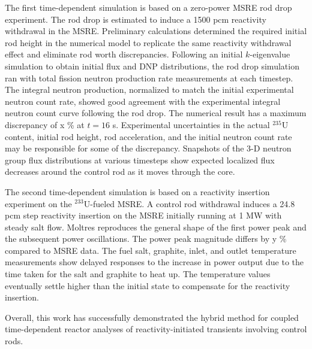 The first time-dependent simulation is based on a zero-power \gls{MSRE} rod drop experiment. The
rod drop is estimated to induce a 1500 pcm reactivity withdrawal in the \gls{MSRE}. Preliminary
calculations determined the required initial rod height in the numerical model to replicate the
same reactivity withdrawal effect and eliminate rod worth discrepancies. Following an initial
$k$-eigenvalue simulation to obtain initial flux and \gls{DNP} distributions, the rod drop
simulation ran with total fission neutron production rate measurements at each timestep. The
integral neutron production, normalized to match the initial experimental neutron count rate,
showed good agreement with the experimental integral neutron count curve following the rod drop.
The numerical result has a maximum discrepancy of x \% at $t=16$ s. Experimental uncertainties in
the actual $^{235}$U content, initial rod height, rod acceleration, and the initial neutron count
rate may be responsible for some of the discrepancy. Snapshots of the 3-D neutron group flux
distributions at various timesteps show expected localized flux decreases around the control rod
as it moves through the core.

The second time-dependent simulation is based on a reactivity insertion experiment on the
$^{233}$U-fueled \gls{MSRE}. A control rod withdrawal induces a 24.8 pcm step reactivity
insertion on the \gls{MSRE} initially running at 1 MW with steady salt flow. Moltres reproduces
the general shape of the first power peak and the subsequent power oscillations. The power peak
magnitude differs by y \% compared to \gls{MSRE} data. The fuel
salt, graphite, inlet, and outlet temperature measurements show delayed responses to the increase
in power output due to the time taken for the salt and graphite to heat up. The temperature values
eventually settle higher than the initial
state to compensate for the reactivity insertion.

Overall, this work has successfully demonstrated the hybrid method for coupled time-dependent
reactor analyses of reactivity-initiated transients involving control rods.
